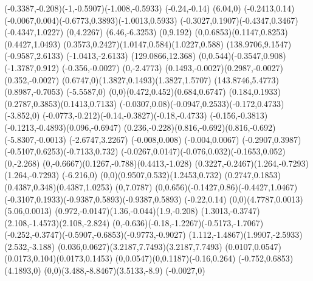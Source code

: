 {    \rcurveto(-0.3387,-0.208)(-1,-0.5907)(-1.008,-0.5933)
    \rlineto(-0.24,-0.14)
    \rlineto(6.04,0)
    \rlineto(-0.2413,0.14)
    \rcurveto(-0.0067,0.004)(-0.6773,0.3893)(-1.0013,0.5933)
    \rcurveto(-0.3027,0.1907)(-0.4347,0.3467)(-0.4347,1.0227)
    \rlineto(0,4.2267)
    \rlineto(6.46,-6.3253)
    \rlineto(0,9.192)
    \rcurveto(0,0.6853)(0.1147,0.8253)(0.4427,1.0493)
    \rcurveto(0.3573,0.2427)(1.0147,0.584)(1.0227,0.588)
    \closepath
    \moveto(138.9706,9.1547)%
    \rlineto(-0.9587,2.6133)
    \rlineto(-1.0413,-2.6133)
    \closepath
    \moveto(129.0866,12.368)%
    \rcurveto(0,0.544)(-0.3547,0.908)(-1.3787,0.912)
    \rlineto(-0.356,-0.0027)
    \rlineto(0,-2.4773)
    \rcurveto(0.1493,-0.0027)(0.2987,-0.0027)(0.352,-0.0027)
    \rcurveto(0.6747,0)(1.3827,0.1493)(1.3827,1.5707)
    \moveto(143.8746,5.4773)%
    \rlineto(0.8987,-0.7053)
    \rlineto(-5.5587,0)
    \rcurveto(0,0)(0.472,0.452)(0.684,0.6747)
    \rcurveto(0.184,0.1933)(0.2787,0.3853)(0.1413,0.7133)
    \rcurveto(-0.0307,0.08)(-0.0947,0.2533)(-0.172,0.4733)
    \rlineto(-3.852,0)
    \rcurveto(-0.0773,-0.212)(-0.14,-0.3827)(-0.18,-0.4733)
    \rcurveto(-0.156,-0.3813)(-0.1213,-0.4893)(0.096,-0.6947)
    \rcurveto(0.236,-0.228)(0.816,-0.692)(0.816,-0.692)
    \rlineto(-5.8307,-0.0013)
    \rlineto(-2.6747,3.2267)
    \rlineto(-0.008,0.008)
    \rlineto(-0.004,0.0067)
    \rcurveto(-0.2907,0.3987)(-0.5107,0.6253)(-0.7133,0.732)
    \rcurveto(-0.0267,0.0147)(-0.076,0.032)(-0.1653,0.052)
    \rlineto(0,-2.268)
    \rcurveto(0,-0.6667)(0.1267,-0.788)(0.4413,-1.028)
    \rcurveto(0.3227,-0.2467)(1.264,-0.7293)(1.264,-0.7293)
    \rlineto(-6.216,0)
    \rcurveto(0,0)(0.9507,0.532)(1.2453,0.732)
    \rcurveto(0.2747,0.1853)(0.4387,0.348)(0.4387,1.0253)
    \rlineto(0,7.0787)
    \rcurveto(0,0.656)(-0.1427,0.86)(-0.4427,1.0467)
    \rcurveto(-0.3107,0.1933)(-0.9387,0.5893)(-0.9387,0.5893)
    \rlineto(-0.22,0.14)
    \rcurveto(0,0)(4.7787,0.0013)(5.06,0.0013)
    \rcurveto(0.972,-0.0147)(1.36,-0.044)(1.9,-0.208)
    \rcurveto(1.3013,-0.3747)(2.108,-1.4573)(2.108,-2.824)
    \rcurveto(0,-0.636)(-0.18,-1.2267)(-0.5173,-1.7067)
    \rcurveto(-0.252,-0.3747)(-0.5907,-0.6853)(-0.9773,-0.9027)
    \rcurveto(1.112,-1.4867)(1.9907,-2.5933)(2.532,-3.188)
    \rcurveto(0.036,0.0627)(3.2187,7.7493)(3.2187,7.7493)
    \rcurveto(0.0107,0.0547)(0.0173,0.104)(0.0173,0.1453)
    \rcurveto(0,0.0547)(0,0.1187)(-0.16,0.264)
    \rlineto(-0.752,0.6853)
    \rlineto(4.1893,0)
    \rcurveto(0,0)(3.488,-8.8467)(3.5133,-8.9)
    \rlineto(-0.0027,0)
}
